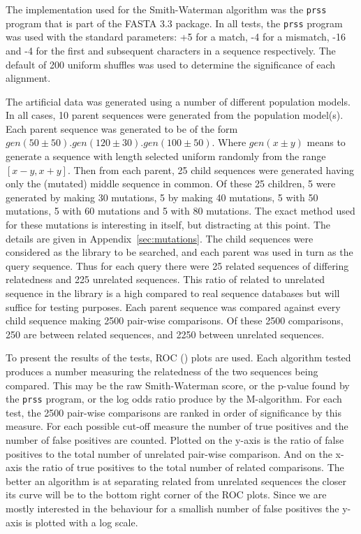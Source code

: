 \documentclass[letterpaper,11pt,oneside]{article}
\begin{document}
The implementation used for the Smith-Waterman algorithm was the \verb!prss!
program that is part of the FASTA 3.3 package.  In all tests, the \verb!prss!
program was used with the standard parameters: +5 for a match, -4 for a
mismatch, -16 and -4 for the first and subsequent characters in a sequence
respectively.  The default of 200 uniform shuffles was used to determine the
significance of each alignment.

The artificial data was generated using a number of different population
models.  In all cases, 10 parent sequences were generated from the population
model(s).  Each parent sequence was generated to be of the form $gen(50\pm50)
. gen(120\pm30) . gen(100\pm50)$.  Where $gen(x\pm y)$ means to generate a
sequence with length selected uniform randomly from the range $[x-y, x+y]$.
Then from each parent, 25 child sequences were generated having only the
(mutated) middle sequence in common.  Of these 25 children, 5 were generated
by making 30 mutations, 5 by making 40 mutations, 5 with 50 mutations, 5 with
60 mutations and 5 with 80 mutations.  The exact method used for these
mutations is interesting in itself, but distracting at this point.  The
details are given in Appendix~\ref{sec:mutations}.  The child sequences were
considered as the library to be searched, and each parent was used in turn as
the query sequence.  Thus for each query there were 25 related sequences of
differing relatedness and 225 unrelated sequences.  This ratio of related to
unrelated sequence in the library is a high compared to real sequence
databases but will suffice for testing purposes.  Each parent sequence was
compared against every child sequence making 2500 pair-wise comparisons.  Of
these 2500 comparisons, 250 are between related sequences, and 2250 between
unrelated sequences.

To present the results of the tests, ROC (\cite{gribskov96, brenner98}) plots
are used.  Each algorithm tested produces a number measuring the relatedness
of the two sequences being compared.  This may be the raw Smith-Waterman
score, or the p-value found by the \verb!prss! program, or the log odds ratio
produce by the M-algorithm.  For each test, the 2500 pair-wise comparisons are
ranked in order of significance by this measure.  For each possible cut-off
measure the number of true positives and the number of false positives are
counted.  Plotted on the y-axis is the ratio of false positives to the total
number of unrelated pair-wise comparison.  And on the x-axis the ratio of true
positives to the total number of related comparisons.  The better an algorithm
is at separating related from unrelated sequences the closer its curve will be
to the bottom right corner of the ROC plots.  Since we are mostly interested
in the behaviour for a smallish number of false positives the y-axis is
plotted with a log scale.
\end{document}
